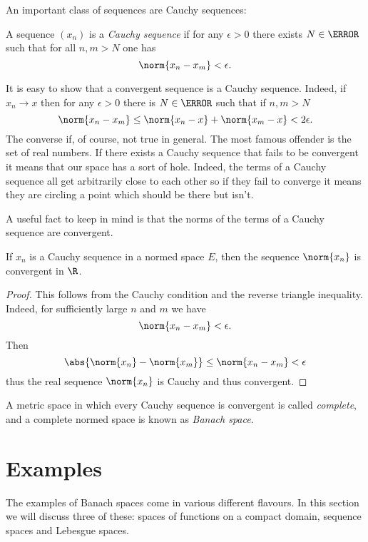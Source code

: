 \documentclass[12pt,oneside]{book}
\begin{document}
An important class of sequences are Cauchy sequences:
\begin{definition}
	A sequence \( (x_n) \) is a \emph{Cauchy sequence} if for any \( \epsilon > 0 \) there
	exists \( N \in \N \) such that for all \( n, m > N \) one has
	\begin{equation*}
		\norm{x_n - x_m} < \epsilon.
	\end{equation*}
\end{definition}
It is easy to show that a convergent sequence is a Cauchy sequence. Indeed, if \( x_n \to
x\) then for any \( \epsilon > 0 \) there is \( N \in \N \) such that if \( n, m > N \)
\begin{equation*}
	\norm{x_n - x_m} \leq \norm{x_n - x} + \norm{x_m - x} < 2\epsilon.
\end{equation*}
The converse if, of course, not true in general. The most famous offender is the
set of real numbers. If there exists a Cauchy sequence that fails to be convergent it
means that our space has a sort of hole. Indeed, the terms of a Cauchy sequence all get
arbitrarily close to each other so if they fail to converge it means they are circling a
point which should be there but isn't.  

A useful fact to keep in mind is that the norms of the terms of a Cauchy sequence are
convergent.
\begin{proposition}\label{prop:norms of Cauchy sequence are convergent}
	If \( x_n \) is a Cauchy sequence in a normed space \( E \), then the sequence \(
	\norm{x_n}  \) is convergent in \( \R \).
\end{proposition}
\begin{proof}
	This follows from the Cauchy condition and the reverse triangle inequality. Indeed, for
	sufficiently large \( n \) and \( m \) we have
	\begin{equation*}
		\norm{x_n - x_m} < \epsilon.
	\end{equation*}
	Then
	\begin{equation*}
		\abs{\norm{x_n} - \norm{x_m}} \leq \norm{x_n - x_m} < \epsilon
	\end{equation*}
	thus the real sequence \( \norm{x_n} \) is Cauchy and thus convergent. 
\end{proof}

A metric space in which every Cauchy sequence is convergent is called \emph{complete}, and
a complete normed space is known as \emph{Banach space}.

\section{Examples}
The examples of Banach spaces come in various different flavours. In this section we will
discuss three of these: spaces of functions on a compact domain, sequence spaces and
Lebesgue spaces.
\end{document}
